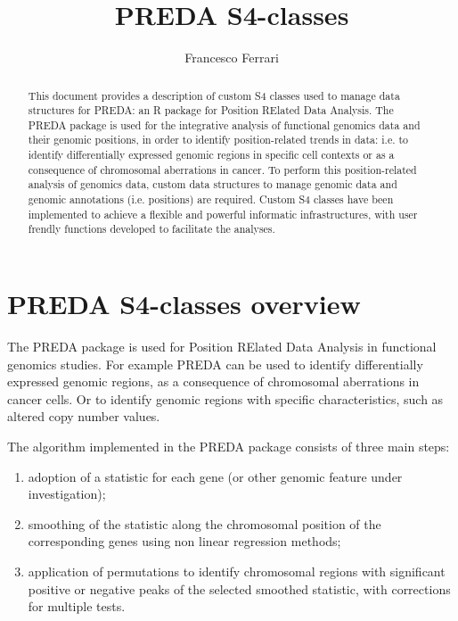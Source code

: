 \documentclass[a4paper,10pt]{article}
\title{PREDA S4-classes}
\author{Francesco Ferrari}
\begin{document}
\maketitle

\begin{abstract}
This document provides a description of custom S4 classes used to manage data structures for PREDA: an R package for Position RElated Data Analysis.
The PREDA package is used for the integrative analysis of functional genomics data and their genomic positions, in order to identify position-related trends in data: i.e. to identify differentially expressed genomic regions in specific cell contexts or as a consequence of chromosomal aberrations in cancer. To perform this position-related analysis of genomics data, custom data structures to manage genomic data and genomic annotations (i.e. positions) are required. Custom S4 classes have been implemented to achieve a flexible and powerful informatic infrastructures, with user frendly functions developed to facilitate the analyses.
\end{abstract}


\tableofcontents

\newpage


\section{PREDA S4-classes overview}

The PREDA package is used for Position RElated Data Analysis in functional genomics studies. For example PREDA can be used to identify differentially expressed genomic regions, as a consequence of chromosomal aberrations in cancer cells. Or to identify genomic regions with specific characteristics, such as altered copy number values.

The algorithm implemented in the PREDA package consists of three main steps:
\begin{enumerate}
\item 
adoption of a statistic for each gene (or other genomic feature under investigation);
\item 
smoothing of the statistic along the chromosomal position of the corresponding genes using non linear regression methods;
\item
application of permutations to identify chromosomal regions with significant positive or negative peaks of the selected smoothed statistic, with corrections for multiple tests.
\end{enumerate}
\end{document}
